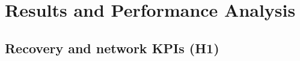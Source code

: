 \documentclass[conference]{IEEEtran}
\begin{document}
\section{Results and Performance Analysis}
\begin{table}[t]
\caption{KPIs of the affected flows (mean and [smallest--largest] over the three seeds; with so few seeds no interval is given). $\geq$ marks a recovery time that includes runs that never recovered (their number in brackets), counted at the run end. A p95 latency of 1000\,ms is the probe's value for a ping that gets no reply.}
\label{tab:kpi}
\centering\small\setlength{\tabcolsep}{4pt}%

\end{table}

\subsection{Recovery and network KPIs (H1)}
\end{document}
